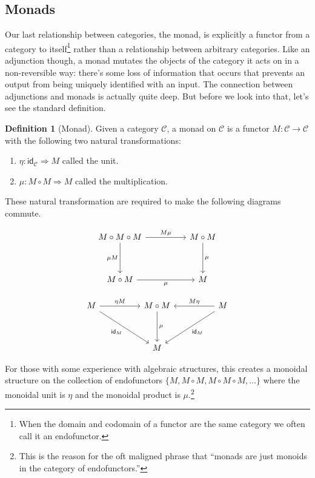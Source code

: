 \documentclass[12pt]{article}
\theoremstyle{definition}
\newtheorem{definition}{Definition}
\begin{document}
\subsection*{Monads}
Our last relationship between categories, the monad, is explicitly a functor from a category to itself\footnote{When the domain and codomain of a functor are the same category we often call it an endofunctor.} rather than a relationship between arbitrary categories.
Like an adjunction though, a monad mutates the objects of the category it acts on in a non-reversible way: there's some loss of information that occurs that prevents an output from being uniquely identified with an input.
The connection between adjunctions and monads is actually quite deep.
But before we look into that, let's see the standard definition.
\begin{definition}[Monad]
    Given a category $\mathcal{C}$, a monad on $\mathcal{C}$ is a functor $M:\mathcal{C}\rightarrow\mathcal{C}$ with the following two natural transformations:
    \begin{enumerate}
        \item $\eta : \mathsf{id}_{\mathcal{C}} \Rightarrow M$ called the unit.
        \item $\mu: M\circ M \Rightarrow M$ called the multiplication.
    \end{enumerate}
    These natural transformation are required to make the following diagrams commute.

    \[\begin{tikzcd}
            M\circ M\circ M && M\circ M \\
            \\
            M\circ M && M
            \arrow["M\mu", from=1-1, to=1-3]
            \arrow["\mu", from=1-3, to=3-3]
            \arrow["\mu"', from=3-1, to=3-3]
            \arrow["{\mu M}"', from=1-1, to=3-1]
        \end{tikzcd}\]

    \[\begin{tikzcd}
            M && M\circ M && M \\
            \\
            && M
            \arrow["{\eta M}", from=1-1, to=1-3]
            \arrow["M\eta"', from=1-5, to=1-3]
            \arrow["\mu", from=1-3, to=3-3]
            \arrow["{\mathsf{id}_M}", from=1-5, to=3-3]
            \arrow["{\mathsf{id}_M}"', from=1-1, to=3-3]
        \end{tikzcd}\]

    For those with some experience with algebraic structures, this creates a monoidal structure on the collection of endofunctors $\{M, M\circ M, M\circ M\circ M,\dots\}$ where the monoidal unit is $\eta$ and the monoidal product is $\mu$.\footnote{This is the reason for the oft maligned phrase that ``monads are just monoids in the category of endofunctors.''}
\end{definition}
\end{document}
